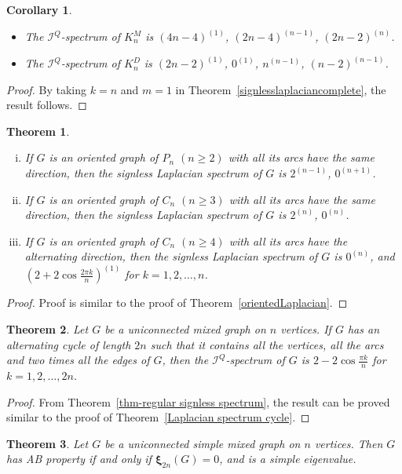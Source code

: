 \documentclass[12pt]{article}
\numberwithin{equation}{section}
\newtheorem{thm}{Theorem}[section]
\newtheorem{cor}{Corollary}[section]
\begin{document}
	\begin{cor}
		\begin{itemize}
			\item[(i)] The $\mathcal{I}^Q$-spectrum of $K^M_{n}$ is $(4n-4)^{(1)}$, $(2n-4)^{(n-1)}$, $(2n-2)^{(n)}$.
			\item[(ii)] The $\mathcal{I}^Q$-spectrum of $K^D_n$ is $(2n-2)^{(1)}$, $0^{(1)}$, $n^{(n-1)}$, $(n-2)^{(n-1)}$.
		\end{itemize}
	\end{cor}
	\begin{proof}
		By taking $k=n$ and $m=1$ in Theorem~\ref{signlesslaplaciancomplete}, the result follows.
	\end{proof}
	\begin{thm}
		\begin{enumerate}[(i)]
			\item If $G$ is an oriented graph of $P_n$ $(n\geq 2)$ with all its arcs have the same direction, then the signless Laplacian spectrum of $G$ is $2^{(n-1)}$, $0^{(n+1)}$.
			\item If $G$ is an oriented graph of $C_n$ $(n\geq 3)$ with all its arcs have the same direction, then the signless Laplacian spectrum of $G$ is $2^{(n)}$, $0^{(n)}$.
			\item If $G$ is an oriented graph of $C_n$ $(n\geq 4)$ with all its arcs have the alternating direction, then the signless Laplacian spectrum of $G$ is $0^{(n)}$, and $(2+2\cos\frac{2\pi k}{n})^{(1)}$ for $k=1,2,\ldots,n$.
		\end{enumerate}
	\end{thm}
	\begin{proof}
		Proof is similar to the proof of  Theorem~\ref{orientedLaplacian}.
	\end{proof}
	\begin{thm}Let $G$ be a uniconnected mixed graph on $n$ vertices. If $G$ has an alternating cycle of length $2n$ such that it contains all the vertices, all the arcs and two times all the edges of $G$, then the $\mathcal{I}^Q$-spectrum of $G$ is $2-2\cos\frac{\pi k}{n}$ for $k=1,2,\ldots,2n$.
	\end{thm}
	\begin{proof}
		From Theorem~\ref{thm-regular signless spectrum}, the result can be proved similar to the proof of Theorem~\ref{Laplacian spectrum cycle}.
	\end{proof}
	\begin{thm}\label{thm3.5}
		Let $G$ be a uniconnected simple mixed graph on $n$ vertices. Then $G$ has AB property if and only if $\bm{\xi}_{2n}(G)=0$, and is a simple eigenvalue.
	\end{thm}
\end{document}
